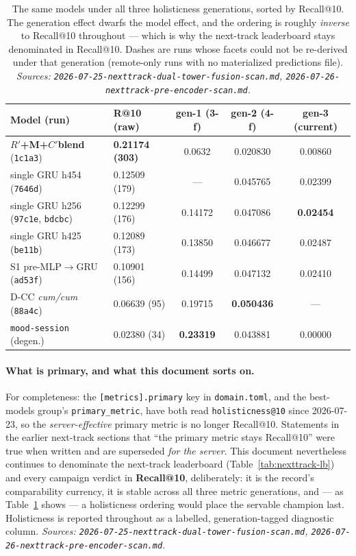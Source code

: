 \documentclass[11pt]{article}
\newcommand{\best}[1]{\textbf{#1}}
\newcommand{\Rp}{\ensuremath{R'}}
\newcommand{\Cp}{\ensuremath{C'}}
\begin{document}
\begin{table}[ht]
  \centering
  \caption{The same models under all three holisticness generations, sorted by
  Recall@10. The generation effect dwarfs the model effect, and the ordering is
  roughly \emph{inverse} to Recall@10 throughout --- which is why the next-track
  leaderboard stays denominated in Recall@10. Dashes are runs whose facets could
  not be re-derived under that generation (remote-only runs with no materialized
  predictions file). \emph{Sources:
  \texttt{2026-07-25-nexttrack-dual-tower-fusion-scan.md},
  \texttt{2026-07-26-nexttrack-pre-encoder-scan.md}.}}
  \label{tab:nexttrack-hgen}
  {\footnotesize\setlength{\tabcolsep}{2.4pt}\begin{tabular}{llccc}
    \toprule
    Model (run) & R@10 (raw) & gen-1 (3-f) & gen-2 (4-f) & gen-3 (current) \\
    \midrule
    \best{\Rp+M+\Cp blend} (\texttt{1c1a3}) & \best{0.21174 (303)} & 0.0632 & 0.020830 & 0.00860 \\
    single GRU h454 (\texttt{7646d}) & 0.12509 (179) & --- & 0.045765 & 0.02399 \\
    single GRU h256 (\texttt{97c1e}, \texttt{bdcbc}) & 0.12299 (176) & 0.14172 & 0.047086 & \best{0.02454} \\
    single GRU h425 (\texttt{be11b}) & 0.12089 (173) & 0.13850 & 0.046677 & 0.02487 \\
    S1 pre-MLP$\to$GRU (\texttt{ad53f}) & 0.10901 (156) & 0.14499 & 0.047132 & 0.02410 \\
    D-CC \emph{cum/cum} (\texttt{88a4c}) & 0.06639 (95) & 0.19715 & \best{0.050436} & --- \\
    \texttt{mood-session} (degen.) & 0.02380 (34) & \best{0.23319} & 0.043881 & 0.00000 \\
    \bottomrule
  \end{tabular}}
\end{table}

\paragraph{What is primary, and what this document sorts on.} For completeness:
the \texttt{[metrics].primary} key in \texttt{domain.toml}, and the best-models
group's \texttt{primary\_metric}, have both read \texttt{holisticness@10} since
2026-07-23, so the \emph{server-effective} primary metric is no longer
Recall@10. Statements
in the earlier next-track sections that ``the primary metric stays Recall@10''
were true when written and are superseded \emph{for the server}. This document
nevertheless continues to denominate the next-track leaderboard
(Table~\ref{tab:nexttrack-lb}) and every campaign verdict in \textbf{Recall@10},
deliberately: it is the record's comparability currency, it is stable across all
three metric generations, and --- as Table~\ref{tab:nexttrack-hgen} shows --- a
holisticness ordering would place the servable champion last. Holisticness is
reported throughout as a labelled, generation-tagged diagnostic column.
\emph{Sources: \texttt{2026-07-25-nexttrack-dual-tower-fusion-scan.md},
\texttt{2026-07-26-nexttrack-pre-encoder-scan.md}.}
\end{document}
